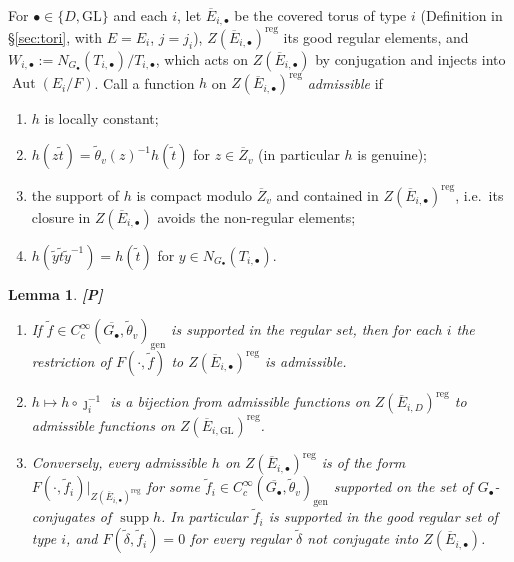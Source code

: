 \documentclass[12pt]{article}
\newcommand{\ov}[1]{\overline{#1}}
\newcommand{\gen}{\mathrm{gen}}
\newcommand{\reg}{\mathrm{reg}}
\newcommand{\Aut}{\operatorname{Aut}}
\newcommand{\supp}{\operatorname{supp}}
\newcommand{\GL}{\mathrm{GL}}
\newcommand{\Zb}{\ov{Z}}
\newcommand{\Eb}{\ov{E}}
\newcommand{\jj}{\jmath}
\newcommand{\Pv}{\textbf{[P]}}
\theoremstyle{plain}
\newtheorem{lemma}[theorem]{Lemma}
\theoremstyle{definition}
\begin{document}
For $\bullet\in\{D,\GL\}$ and each $i$, let $\Eb_{i,\bullet}$ be the covered torus of type $i$ (Definition in \S\ref{sec:tori}, with $E=E_i$, $j=j_i$), $Z(\Eb_{i,\bullet})^{\reg}$ its good regular elements, and $W_{i,\bullet}:=N_{G_\bullet}(T_{i,\bullet})/T_{i,\bullet}$, which acts on $Z(\Eb_{i,\bullet})$ by conjugation and injects into $\Aut(E_i/F)$. Call a function $h$ on $Z(\Eb_{i,\bullet})^{\reg}$ \emph{admissible} if
\begin{enumerate}[label=(\roman*)]
\item $h$ is locally constant;
\item $h(z\tilde t)=\tilde\theta_v(z)^{-1}h(\tilde t)$ for $z\in\Zb_v$ (in particular $h$ is genuine);
\item the support of $h$ is compact modulo $\Zb_v$ and contained in $Z(\Eb_{i,\bullet})^{\reg}$, i.e.\ its closure in $Z(\Eb_{i,\bullet})$ avoids the non-regular elements;
\item $h(\tilde y\tilde t\tilde y^{-1})=h(\tilde t)$ for $y\in N_{G_\bullet}(T_{i,\bullet})$.
\end{enumerate}

\begin{lemma}\label{lem:transported}\Pv
\begin{enumerate}[label=(\alph*)]
\item If $\tilde f\in C_c^\infty(\ov{G_\bullet},\tilde\theta_v)_\gen$ is supported in the regular set, then for each $i$ the restriction of $F(\cdot,\tilde f)$ to $Z(\Eb_{i,\bullet})^{\reg}$ is admissible.
\item $h\mapsto h\circ\jj_i^{-1}$ is a bijection from admissible functions on $Z(\Eb_{i,D})^{\reg}$ to admissible functions on $Z(\Eb_{i,\GL})^{\reg}$.
\item Conversely, every admissible $h$ on $Z(\Eb_{i,\bullet})^{\reg}$ is of the form $F(\cdot,\tilde f_i)|_{Z(\Eb_{i,\bullet})^{\reg}}$ for some $\tilde f_i\in C_c^\infty(\ov{G_\bullet},\tilde\theta_v)_\gen$ supported on the set of $G_\bullet$-conjugates of $\supp h$. In particular $\tilde f_i$ is supported in the good regular set of type $i$, and $F(\tilde\delta,\tilde f_i)=0$ for every regular $\tilde\delta$ not conjugate into $Z(\Eb_{i,\bullet})$.
\end{enumerate}
\end{lemma}
\end{document}
